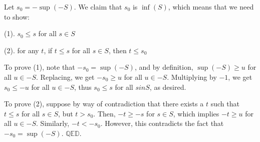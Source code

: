 \documentclass[]{article}
\begin{document}
Let $s_0 = -\sup(-S)$. We claim that $s_0$ is $\inf(S)$, which means
that we need to show:

(1). $s_0 \le s$ for all $s \in S$

(2). for any $t$, if $t \le s$ for all $s \in S$, then $t \le s_0$

To prove (1), note that $-s_0 = \sup(-S)$, and by definition,
$\sup(-S) \ge u$ for all $u \in -S$. Replacing, we get $-s_0 \ge u$ for
all $u \in -S$. Multiplying by $-1$, we get $s_0 \le -u$ for all
$u \in -S$, thus $s_0 \le s$ for all $s in S$, as desired.

To prove (2), suppose by way of contradiction that there exists a $t$
such that $t \le s$ for all $s \in S$, but $t > s_0$. Then, $-t \ge -s$
for $s \in S$, which implies $-t \ge u$ for all $u \in -S$. Similarly,
$-t < -s_0$. However, this contradicts the fact that $-s_0 = \sup(-S)$.
$\mathbb{QED}$.
\end{document}
